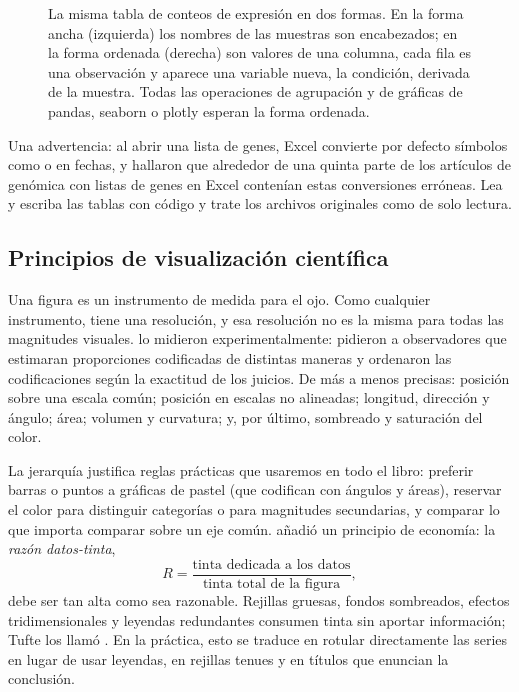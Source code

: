 \begin{figure}[t]
\caption[De la forma ancha a la forma ordenada]{La misma tabla de conteos de expresión en dos formas. En la forma ancha (izquierda) los nombres de las muestras son encabezados; en la forma ordenada (derecha) son valores de una columna, cada fila es una observación y aparece una variable nueva, la condición, derivada de la muestra. Todas las operaciones de agrupación y de gráficas de pandas, seaborn o plotly esperan la forma ordenada.}
\label{fig:00-tidy}
\end{figure}


Una advertencia: al abrir una lista de genes, Excel convierte por defecto símbolos como  o  en fechas, y \textcite{c00-ziemann2016} hallaron que alrededor de una quinta parte de los artículos de genómica con listas de genes en Excel contenían estas conversiones erróneas. Lea y escriba las tablas con código y trate los archivos originales como de solo lectura.

\subsection{Principios de visualización científica}

Una figura es un instrumento de medida para el ojo. Como cualquier instrumento, tiene una resolución, y esa resolución no es la misma para todas las magnitudes visuales. \textcite{c00-cleveland1984} lo midieron experimentalmente: pidieron a observadores que estimaran proporciones codificadas de distintas maneras y ordenaron las codificaciones según la exactitud de los juicios. De más a menos precisas: posición sobre una escala común; posición en escalas no alineadas; longitud, dirección y ángulo; área; volumen y curvatura; y, por último, sombreado y saturación del color.

La jerarquía justifica reglas prácticas que usaremos en todo el libro: preferir barras o puntos a gráficas de pastel (que codifican con ángulos y áreas), reservar el color para distinguir categorías o para magnitudes secundarias, y comparar lo que importa comparar sobre un eje común. \textcite{c00-tufte2001} añadió un principio de economía: la \emph{razón datos-tinta},
\begin{equation}\label{eq:00-tinta}
R = \frac{\text{tinta dedicada a los datos}}{\text{tinta total de la figura}},
\end{equation}
debe ser tan alta como sea razonable. Rejillas gruesas, fondos sombreados, efectos tridimensionales y leyendas redundantes consumen tinta sin aportar información; Tufte los llamó . En la práctica, esto se traduce en rotular directamente las series en lugar de usar leyendas, en rejillas tenues y en títulos que enuncian la conclusión.

